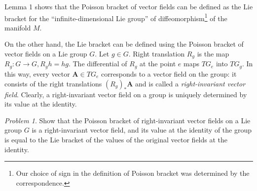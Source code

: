 \documentclass[leqno]{book}
\numberwithin{equation}{section}
\theoremstyle{plain}
\theoremstyle{definition}
\theoremstyle{remark}
\theoremstyle{smallcap}
\newtheorem*{prob*}{Problem}
\numberwithin{prob}{section}
\begin{document}
Lemma 1 shows that the Poisson bracket of vector fields
can be defined as the Lie bracket for the
``infinite-dimensional Lie group''
of diffeomorphism\footnote{
  Our choice of sign in the definition of Poisson bracket
  was determined by the correspondence.
}
of the manifold $M$.

On the other hand,
the Lie bracket can be defined
using the Poisson bracket of vector fields
on a Lie group $G$.
%
Let $g \in G$.
%
Right translation $R_g$ is the map
$R_g: G \rightarrow G, R_g h = h g$.
%
The differential of $R_g$ at the point $e$
maps $TG_e$ into $TG_g$.
%
%
In this way, every vector $\mathbf A \in TG_e$
corresponds to a vector field on the group:
it consists of the right translations $(R_g)_* \mathbf A$
and is called a \emph{right-invariant vector field}.
%
Clearly, a right-invariant vector field
on a group is uniquely determined by its value
at the identity.

\begin{prob*}
  Show that the Poisson bracket of right-invariant vector fields
  on a Lie group $G$ is a right-invariant vector field,
  and its value at the identity of the group is equal to
  the Lie bracket of the values of the original vector fields
  at the identity.
\end{prob*}
\end{document}
